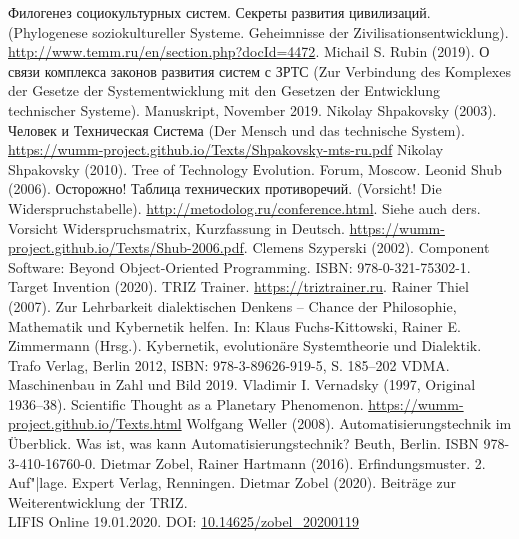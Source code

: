 \documentclass[11pt,a4paper]{article}
\begin{document}
\begin{thebibliography}{xxx}
  \foreignlanguage{russian}{Филогенез социокультурных систем. Секреты развития
    цивилизаций}.  (Phylogenese soziokultureller Systeme. Geheimnisse der
  Zivilisationsentwicklung).
  \url{http://www.temm.ru/en/section.php?docId=4472}.
 Michail S. Rubin (2019).  \foreignlanguage{russian}{О
  связи комплекса законов развития систем с ЗРТС} (Zur Verbindung des
  Komplexes der Gesetze der Systementwicklung mit den Gesetzen der Entwicklung
  technischer Systeme). Manuskript, November 2019.
 Nikolay Shpakovsky (2003).
  \foreignlanguage{russian}{Человек и Техническая Система} (Der Mensch und das
  technische System).
  \url{https://wumm-project.github.io/Texts/Shpakovsky-mts-ru.pdf}
 Nikolay Shpakovsky (2010).  Tree of Technology
  Еvolution. Forum, Moscow.
 Leonid Shub (2006). \foreignlanguage{russian}{Осторожно!
  Таблица технических противоречий}. (Vorsicht! Die Widerspruchstabelle).
  \url{http://metodolog.ru/conference.html}. Siehe auch ders. Vorsicht
  Widerspruchsmatrix, Kurzfassung in Deutsch.
  \url{https://wumm-project.github.io/Texts/Shub-2006.pdf}.
 Clemens Szyperski (2002). Component Software: Beyond
  Object-Oriented Programming. ISBN: 978-0-321-75302-1.
 Target Invention (2020). TRIZ Trainer.
  \url{https://triztrainer.ru}.
 Rainer Thiel (2007). Zur Lehrbarkeit dialektischen Denkens
  – Chance der Philosophie, Mathematik und Kybernetik helfen. In: Klaus
  Fuchs-Kittowski, Rainer E. Zimmermann (Hrsg.). Kybernetik, evolutionäre
  Systemtheorie und Dialektik. Trafo Verlag, Berlin 2012, ISBN:
  978-3-89626-919-5, S. 185--202
 VDMA. Maschinenbau in Zahl und Bild 2019. 
 Vladimir I. Vernadsky (1997, Original 1936--38).
  Scientific Thought as a Planetary Phenomenon.
  \url{https://wumm-project.github.io/Texts.html}
 Wolfgang Weller (2008). Automatisierungstechnik im
  Überblick. Was ist, was kann Automatisierungstechnik? Beuth, Berlin. ISBN
  978-3-410-16760-0.
 Dietmar Zobel, Rainer Hartmann (2016). Erfindungsmuster.
  2. Auf"|lage.  Expert Verlag, Renningen.
 Dietmar Zobel (2020). Beiträge zur Weiterentwicklung der
  TRIZ.\\  LIFIS Online 19.01.2020. DOI: \url{10.14625/zobel_20200119}
\end{thebibliography}
\end{document}
